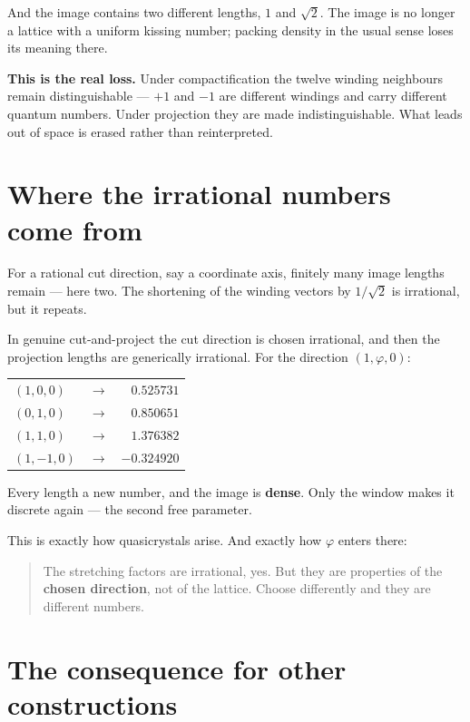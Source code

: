 \documentclass[11pt]{report}
\begin{document}
And the image contains two different lengths, $1$ and $\sqrt2$. The
image is no longer a lattice with a uniform kissing number; packing
density in the usual sense loses its meaning there.

\textbf{This is the real loss.} Under compactification the twelve
winding neighbours remain distinguishable --- $+1$ and $-1$ are
different windings and carry different quantum numbers. Under
projection they are made indistinguishable. What leads out of space is
erased rather than reinterpreted.

\section{Where the irrational numbers come from}

For a rational cut direction, say a coordinate axis, finitely many
image lengths remain --- here two. The shortening of the winding
vectors by $1/\sqrt2$ is irrational, but it repeats.

In genuine cut-and-project the cut direction is chosen irrational, and
then the projection lengths are generically irrational. For the
direction $(1, \varphi, 0)$:
\begin{center}
\begin{tabular}{lcr}
$(1, 0, 0)$ & $\longrightarrow$ & $0.525731$ \\
$(0, 1, 0)$ & $\longrightarrow$ & $0.850651$ \\
$(1, 1, 0)$ & $\longrightarrow$ & $1.376382$ \\
$(1,-1, 0)$ & $\longrightarrow$ & $-0.324920$ \\
\end{tabular}
\end{center}

Every length a new number, and the image is \textbf{dense}. Only the
window makes it discrete again --- the second free parameter.

This is exactly how quasicrystals arise. And exactly how $\varphi$
enters there:

\begin{quote}
The stretching factors are irrational, yes. But they are properties of
the \textbf{chosen direction}, not of the lattice. Choose differently
and they are different numbers.
\end{quote}

\section{The consequence for other constructions}
\end{document}
